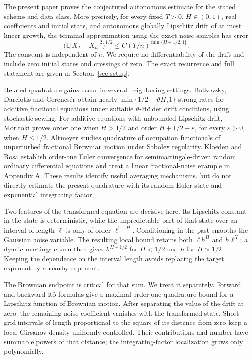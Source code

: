 \documentclass[11pt]{article}
\theoremstyle{remark}
\newcommand{\E}{\mathbb E}
\newcommand{\abs}[1]{\lvert#1\rvert}
\begin{document}
The present paper proves the conjectured autonomous estimate for the
stated scheme and data class. More precisely, for every fixed
\(T>0\), \(H\in(0,1)\), real coefficients and initial state, and
autonomous globally Lipschitz drift of at most linear growth, the
terminal approximation using the exact noise samples has error
\[
 \bigl(\E\abs{X_T-X_n}^2\bigr)^{1/2}
 \le C(T/n)^{\min\{H+1/2,1\}} .
\]
The constant is independent of \(n\). We require no differentiability
of the drift and include zero initial states and crossings of zero.
The exact recurrence and full statement are given in
Section~\ref{sec:setup}.

Related quadrature gains occur in several neighboring settings.
Butkovsky, Dareiotis and Gerencs\'er \cite{BDG} obtain nearly
\(\min\{1/2+\vartheta H,1\}\) strong rates for additive fractional
equations under suitable \(\vartheta\)-H\"older drift conditions,
using stochastic sewing. For additive equations with unbounded
Lipschitz drift, Moritoki \cite[Theorem 1.1]{Moritoki} proves order
one when \(H>1/2\) and order \(H+1/2-\varepsilon\), for every
\(\varepsilon>0\), when \(H\le1/2\).
Altmeyer \cite[Theorems 4--5]{Altmeyer} studies quadrature of
occupation functionals of unperturbed fractional Brownian motion
under Sobolev regularity. Kloeden and Rosa \cite{KR} establish
order-one Euler convergence for semimartingale-driven random
ordinary differential equations and treat a linear fractional-noise
example in Appendix A. These results identify useful averaging
mechanisms, but do not directly estimate the present quadrature with
its random Euler state and exponential integrating factor.

Two features of the transformed equation are decisive here.
Its Lipschitz constant in the state is deterministic, while the
unpredictable part of that state over an interval of length
\(\ell\) is only of order \(\ell^{1+H}\).
Conditioning in the past smooths the Gaussian noise variable.
The resulting local bound retains both
\(\ell h^H\) and \(h\ell^H\); a dyadic martingale sum then gives
\(h^{H+1/2}\) for \(H<1/2\) and \(h\) for \(H>1/2\).
Keeping the dependence on the interval length avoids replacing the
target exponent by a nearby exponent.

The Brownian endpoint is critical for that sum. We treat it separately.
Forward and backward It\^o formulas give a maximal order-one
quadrature bound for a Lipschitz function of Brownian motion.
After separating the value of the drift at zero, the remaining
noise coefficient vanishes with the transformed state.
Short grid intervals of length proportional to the square of its
distance from zero keep a local Girsanov density uniformly controlled.
Their contributions and number have summable powers of that distance;
the integrating-factor localization grows only polynomially.
\end{document}
